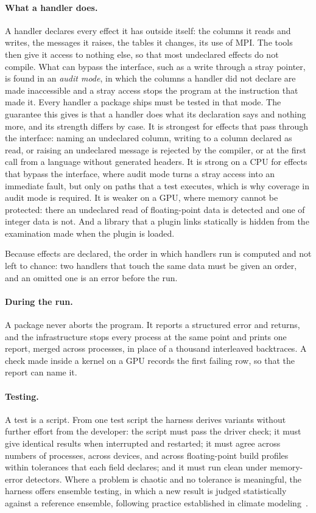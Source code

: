 \documentclass[11pt,a4paper]{article}
\begin{document}
\paragraph{What a handler does.}  A handler declares every effect it has
outside itself: the columns it reads and writes, the messages it raises, the
tables it changes, its use of MPI.  The tools then give it access to
nothing else, so that most undeclared effects do not compile.  What can
bypass the interface, such as a write through a stray pointer, is found in
an \emph{audit mode}, in which the columns a handler did not declare are
made inaccessible and a stray access stops the program at the instruction
that made it.  Every handler a package ships must be tested in that mode.
The guarantee this gives is that a handler does what its declaration says
and nothing more, and its strength differs by case.  It is strongest for
effects that pass through the interface: naming an undeclared column,
writing to a column declared as read, or raising an undeclared message is
rejected by the compiler, or at the first call from a language without
generated headers.  It is strong on a CPU for effects that bypass the
interface, where audit mode turns a stray access into an immediate fault,
but only on paths that a test executes, which is why coverage in audit mode
is required.  It is weaker on a GPU, where memory cannot be protected:
there an undeclared read of floating-point data is detected and one of
integer data is not.  And a library that a plugin links statically is
hidden from the examination made when the plugin is loaded.

Because effects are declared, the order in which handlers run is computed
and not left to chance: two handlers that touch the same data must be given
an order, and an omitted one is an error before the run.

\paragraph{During the run.}  A package never aborts the program.  It
reports a structured error and returns, and the infrastructure stops every
process at the same point and prints one report, merged across processes,
in place of a thousand interleaved backtraces.  A check made inside a
kernel on a GPU records the first failing row, so that the report can name
it.

\paragraph{Testing.}  A test is a script.  From one test script the harness
derives variants without further effort from the developer: the script must
pass the driver check; it must give identical results when interrupted and
restarted; it must agree across numbers of processes, across devices, and
across floating-point build profiles within tolerances that each field
declares; and it must run clean under memory-error detectors.  Where a
problem is chaotic and no tolerance is meaningful, the harness offers
ensemble testing, in which a new result is judged statistically against a
reference ensemble, following practice established in climate
modeling~\cite{cesmect}.
\end{document}
